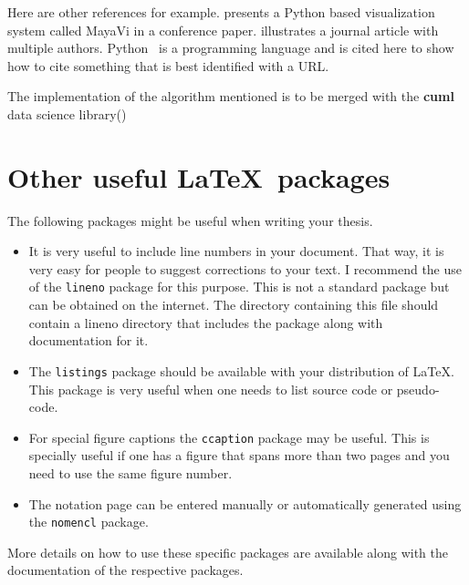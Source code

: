 Here are other references for example.  \citet{viz:mayavi} presents a
Python based visualization system called MayaVi in a conference paper.
\citet{pan:pr:flat-fst} illustrates a journal article with multiple
authors.  Python~\citep{py:python} is a programming language and is
cited here to show how to cite something that is best identified with
a URL. 

The implementation of the algorithm mentioned is to be merged with the \textbf{cuml} data science library(\cite{raschka2020machine})

 
 \section{Other useful \LaTeX\ packages}
 
 The following packages might be useful when writing your thesis.
 
 \begin{itemize}  
 \item It is very useful to include line numbers in your document.
   That way, it is very easy for people to suggest corrections to your
   text.  I recommend the use of the \texttt{lineno} package for this
   purpose.  This is not a standard package but can be obtained on the
   internet.  The directory containing this file should contain a
   lineno directory that includes the package along with documentation
   for it.
 
 \item The \texttt{listings} package should be available with your
   distribution of \LaTeX.  This package is very useful when one needs
   to list source code or pseudo-code.
 
 \item For special figure captions the \texttt{ccaption} package may be
   useful.  This is specially useful if one has a figure that spans
   more than two pages and you need to use the same figure number.
 
 \item The notation page can be entered manually or automatically
   generated using the \texttt{nomencl} package.
 
 \end{itemize}
 
 More details on how to use these specific packages are available along
 with the documentation of the respective packages.

